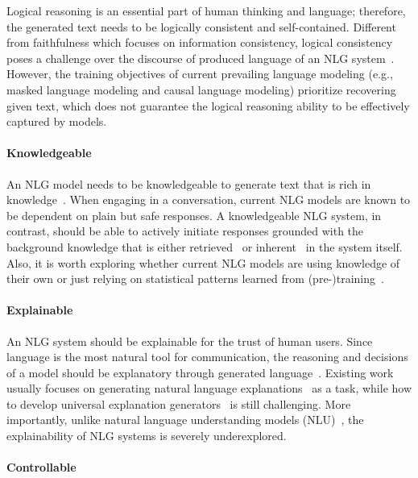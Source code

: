Logical reasoning is an essential part of human thinking and language; therefore, the generated text needs to be logically consistent and self-contained.
Different from faithfulness which focuses on information consistency, logical consistency poses a challenge over the discourse of produced language of an NLG system~\cite{betz-etal-2021-critical,chen-etal-2020-logical,shi-etal-2021-refine-imitate,shu-etal-2021-logic,pi2022logigan}.
However, the training objectives of current prevailing language modeling (e.g., masked language modeling and causal language modeling) prioritize recovering given text, which does not guarantee the logical reasoning ability to be effectively captured by models.


\paragraph{Knowledgeable}

An NLG model needs to be knowledgeable to generate text that is rich in knowledge~\cite{yu2022survey}.
When engaging in a conversation, current NLG models are known to be dependent on plain but safe responses.
A knowledgeable NLG system, in contrast, should be able to actively initiate responses grounded with the background knowledge that is either retrieved~\cite{NEURIPS2020_6b493230} or inherent~\cite{liu-etal-2022-multi} in the system itself.
Also, it is worth exploring whether current NLG models are using knowledge of their own or just relying on statistical patterns learned from (pre-)training~\cite{cao-etal-2021-knowledgeable}.


\paragraph{Explainable}
An NLG system should be explainable for the trust of human users.
Since language is the most natural tool for communication, the reasoning and decisions of a model should be explanatory through generated language~\cite{reiter2019natural}.
Existing work usually focuses on generating natural language explanations~\cite{wiegreffe-marasovic-2021-review} as a task, while how to develop universal explanation generators~\cite{ye2022unreliability} is still challenging.
More importantly, unlike natural language understanding models (NLU)~\cite{lime,Schulz2020Restricting,10.5555/3305890.3306024}, the explainability of NLG systems is severely underexplored.



\paragraph{Controllable}

